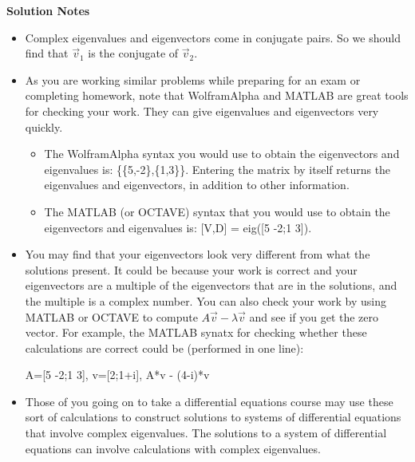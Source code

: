 \begin{parts}
{            \textbf{Solution Notes} 
            \begin{itemize}
            \item Complex eigenvalues and eigenvectors come in conjugate pairs. So we should find that $\vec v_1$ is the conjugate of $\vec v_2$. 
            \item As you are working similar problems while preparing for an exam or completing homework, note that WolframAlpha and MATLAB are great tools for checking your work. They can give eigenvalues and eigenvectors very quickly. 
            \begin{itemize}
                \item The WolframAlpha syntax you would use to obtain the eigenvectors and eigenvalues is: \{\{5,-2\},\{1,3\}\}. Entering the matrix by itself returns the eigenvalues and eigenvectors, in addition to other information. 
                \item The MATLAB (or OCTAVE) syntax that you would use to obtain the eigenvectors and eigenvalues is: 
                [V,D] = eig([5 -2;1 3]).
            \end{itemize}
            \item You may find that your eigenvectors look very different from what the solutions present. It could be because your work is correct and your eigenvectors are a multiple of the eigenvectors that are in the solutions, and the multiple is a complex number. You can also check your work by using MATLAB or OCTAVE to compute $A\vec v - \lambda \vec v$ and see if you get the zero vector. For example, the MATLAB synatx for checking whether these calculations are correct could be (performed in one line):
            \begin{center}
                A=[5 -2;1 3], v=[2;1+i], A*v - (4-i)*v
            \end{center}
            \item Those of you going on to take a differential equations course may use these sort of calculations to construct solutions to systems of differential equations that involve complex eigenvalues. The solutions to a system of differential equations can involve calculations with complex eigenvalues. 
            \end{itemize}
            }
        \fi                  
        
    \end{parts}
\fi 


